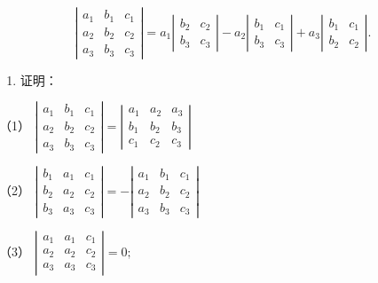 \[
\left| \begin{array}{ccc} a _ {1} & b _ {1} & c _ {1} \\ a _ {2} & b _ {2} & c _ {2} \\ a _ {3} & b _ {3} & c _ {3} \end{array} \right| = a _ {1} \left| \begin{array}{cc} b _ {2} & c _ {2} \\ b _ {3} & c _ {3} \end{array} \right| - a _ {2} \left| \begin{array}{cc} b _ {1} & c _ {1} \\ b _ {3} & c _ {3} \end{array} \right| + a _ {3} \left| \begin{array}{cc} b _ {1} & c _ {1} \\ b _ {2} & c _ {2} \end{array} \right|.
\]

\begin{enumerate}[start=4]
\item
  证明：
\end{enumerate}

（1）
\(\left| \begin{array}{lll}a_{1} & b_{1} & c_{1}\\ a_{2} & b_{2} & c_{2}\\ a_{3} & b_{3} & c_{3} \end{array} \right| = \left| \begin{array}{lll}a_{1} & a_{2} & a_{3}\\ b_{1} & b_{2} & b_{3}\\ c_{1} & c_{2} & c_{3} \end{array} \right|\)

（2）
\(\left| \begin{array}{lll}b_{1} & a_{1} & c_{1}\\ b_{2} & a_{2} & c_{2}\\ b_{3} & a_{3} & c_{3} \end{array} \right| = -\left| \begin{array}{lll}a_{1} & b_{1} & c_{1}\\ a_{2} & b_{2} & c_{2}\\ a_{3} & b_{3} & c_{3} \end{array} \right|\)

（3）
\(\left| \begin{array}{lll}a_{1} & a_{1} & c_{1}\\ a_{2} & a_{2} & c_{2}\\ a_{3} & a_{3} & c_{3} \end{array} \right| = 0;\)

